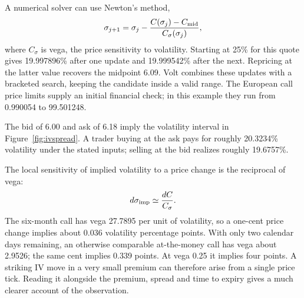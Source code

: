 \documentclass[8pt]{strategynet-journal}
\begin{document}
\begin{SNcolumns}
A numerical solver can use Newton's method,
\[
 \sigma_{j+1}=\sigma_j-
 \frac{C(\sigma_j)-C_{\rm mid}}{C_\sigma(\sigma_j)},
\]
where $C_\sigma$ is vega, the price sensitivity to volatility. Starting at 25\%
for this quote gives 19.997896\% after one update and 19.999542\% after the next.
Repricing at the latter value recovers the midpoint 6.09. Volt combines these
updates with a bracketed search, keeping the candidate inside a valid range.
The European call price limits supply an initial financial check; in this
example they run from 0.990054 to 99.501248.

The bid of 6.00 and ask of 6.18 imply the volatility interval in
Figure~\ref{fig:ivspread}. A trader
buying at the ask pays for roughly 20.3234\% volatility under the stated inputs;
selling at the bid realizes roughly 19.6757\%.

\begin{center}\begin{minipage}{\linewidth}\centering
{}
\label{fig:ivspread}
\end{minipage}\end{center}

The local sensitivity of implied volatility to a price change is the reciprocal
of vega:
\[
 d\sigma_{\rm imp}\simeq\frac{dC}{C_\sigma}.
\]
The six-month call has vega 27.7895 per unit of volatility, so a one-cent price
change implies about 0.036 volatility percentage points. With only two calendar
days remaining, an otherwise comparable at-the-money call has vega about
2.9526; the same cent implies 0.339 points. At vega 0.25 it implies four points.
A striking IV move in a very small premium can therefore arise from a single
price tick. Reading it alongside the premium, spread and time to expiry gives
a much clearer account of the observation.


\end{SNcolumns}
\end{document}
